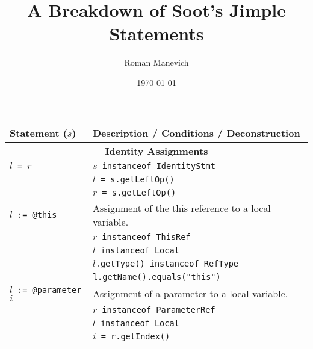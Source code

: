 \documentclass{article}
\title{A Breakdown of Soot's Jimple Statements}
\date{\today}
\author{Roman Manevich}
\makeatletter
\newcommand{\This}{@\texttt{this}}
\newcommand{\Parameter}{@\texttt{parameter}}
\makeatother
\begin{document}
\maketitle


\begin{scriptsize}
\begin{tabular}{ll}
\hline
\textbf{Statement} ($s$)      & \textbf{Description / Conditions / Deconstruction}\\
\hline
\hline
\multicolumn{2}{c}{\textbf{Identity Assignments}}\\
\texttt{$l$ = $r$}           & \texttt{$s$ instanceof IdentityStmt}\\
                & \texttt{$l$ = s.getLeftOp()} \\
                & \texttt{$r$ = s.getLeftOp()} \\
\hline
\texttt{$l$ := \This}   & Assignment of the this reference to a local variable.\\
   & \texttt{$r$ instanceof ThisRef}\\
   & \texttt{$l$ instanceof Local}\\
   & \texttt{$l$.getType() instanceof RefType}\\
   & \texttt{l.getName().equals("this")}\\
\hline
\texttt{$l$ := \Parameter $i$}   & Assignment of a parameter to a local variable.\\
   & \texttt{$r$ instanceof ParameterRef}\\
   & \texttt{$l$ instanceof Local}\\
   & \texttt{$i$ = r.getIndex()}\\
\hline
\hline
\end{tabular}
\end{scriptsize}
\end{document}
